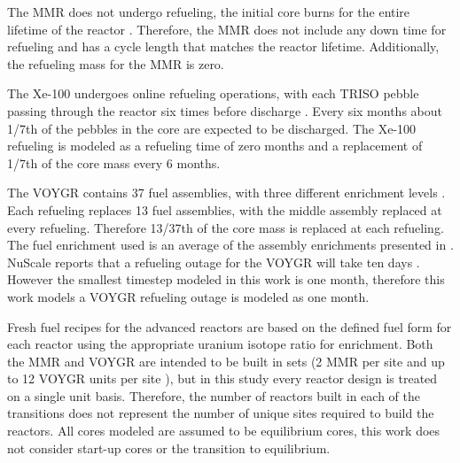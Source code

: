 The \gls{MMR} does not undergo refueling, the initial core
burns for the entire lifetime of the reactor \cite{mitchell_usnc_2020}. 
Therefore, the \gls{MMR}
does not include any down time for refueling and has a cycle length that 
matches the reactor lifetime. Additionally, the refueling mass for the
\gls{MMR} is zero. 

The Xe-100 undergoes online refueling operations, with each 
\gls{TRISO} pebble passing 
through the reactor six times before discharge \cite{mulder_overview_2021}. 
Every six months about 1/7th 
of the pebbles in the core are expected to be discharged. The Xe-100 
refueling is modeled as a refueling time of zero months and a 
replacement of 1/7th of the core mass every 
6 months.  

The VOYGR contains 37 fuel assemblies, with three different enrichment 
levels \cite{nuscale_chapter_2020-1}. Each refueling replaces 13 fuel 
assemblies, with the middle assembly replaced at every refueling. 
Therefore 13/37th of the core mass is replaced at each refueling. 
The fuel enrichment used is an average of the assembly enrichments 
presented in \cite{nuscale_chapter_2020-1}. NuScale reports that a refueling 
outage for the VOYGR will take ten days \cite{nuscale_nuscale_2022}. However 
the smallest timestep modeled in this work is one month, therefore this 
work models a VOYGR 
refueling outage is modeled as one month. 

Fresh fuel 
recipes for the advanced reactors are based on the 
defined fuel form for each reactor using the appropriate uranium isotope 
ratio for enrichment. Both the \gls{MMR} and VOYGR are intended to be built 
in sets (2 \gls{MMR} per site \cite{noauthor_usnc_2021} and up to 12 VOYGR 
units per site \cite{reyes_nuscale_2021}), but in this study every reactor 
design is treated 
on a single unit basis. Therefore, the number of reactors built in each 
of the transitions does not represent the number of unique sites required 
to build the reactors. All cores modeled are assumed to be equilibrium cores, 
this work does not consider start-up cores or the transition to equilibrium. 


